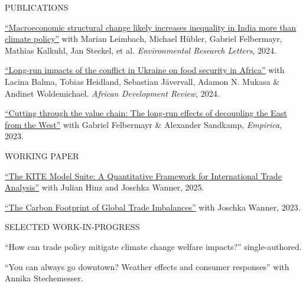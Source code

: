 \documentclass{article}
\begin{document}
\begin{minipage}[t]{0.12\textwidth}
    {\selectfont PUBLICATIONS} \\
\end{minipage}
\hspace{5mm}
\begin{minipage}[t]{0.8\textwidth}
    \href{https://www.doi.org/10.1088/1748-9326/ad34e9}{``Macroeconomic structural change likely increases inequality in India more than climate policy''} with Marian Leimbach, Michael Hübler, Gabriel Felbermayr, Mathias Kalkuhl, Jan Steckel, et al. \textit{Environmental Research Letters}, 2024. \par
    \href{http://doi.org/10.1111/1467-8268.12745}{``Long-run impacts of the conflict in Ukraine on food security in Africa''} with Lacina Balma, Tobias Heidland, Sebastian Jävervall, Adamon N. Mukasa \& Andinet Woldemichael. \textit{African Development Review}, 2024. \par
    \href{https://doi.org/10.1007/s10663-022-09561-w}{``Cutting through the value chain: The long-run effects of decoupling the East from the West''} with Gabriel Felbermayr \& Alexander Sandkamp, \textit{Empirica}, 2023. \par
\end{minipage}
\medskip


\begin{minipage}[t]{0.12\textwidth}
    {\selectfont WORKING PAPER} \\
\end{minipage}
\hspace{5mm}
\begin{minipage}[t]{0.8\textwidth}
    \href{https://trade.ifw-kiel.de/KTTM/KITE_whitepaper.pdf}{``The KITE Model Suite: A Quantitative Framework for
International Trade Analysis''} with Julian Hinz and Joschka Wanner, 2025. \par
    \href{https://www.cesifo.org/en/publications/2023/working-paper/carbon-footprint-global-trade-imbalances}{``The Carbon Footprint of Global Trade Imbalances''} with Joschka Wanner, 2023. \par
\end{minipage}
\medskip


\begin{minipage}[t]{0.12\textwidth}
    {\selectfont SELECTED WORK-IN-PROGRESS} \\
\end{minipage}
\hspace{5mm}
\begin{minipage}[t]{0.8\textwidth}
    ``How can trade policy mitigate climate change welfare impacts?'' single-authored.\par
    ``You can always go downtown? Weather effects and consumer responses'' with Annika Stechemesser.\par
\end{minipage}
\medskip
\end{document}
